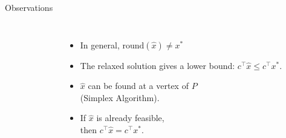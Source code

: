 \begin{frame}{Observations}
\begin{columns}
\begin{figure}[p]
        \centering
        
    \end{figure}

\begin{itemize}[<+->]
\item In general, $\text{round}(\hat{x}) \neq x^*$

\item The relaxed solution gives a lower bound: $c^\top \hat{x} \leq c^\top x^*$.

\item $\hat{x}$ can be found at a vertex of $P$\\
(Simplex Algorithm).

\item If $\hat{x}$ is already feasible,\\
then $c^\top \hat{x} = c^\top x^*$.


\end{itemize}
\end{columns}
	
\end{frame}